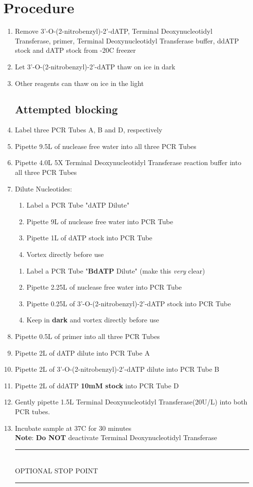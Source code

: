 \documentclass[letterpaper]{article}
\newcommand{\tdt}{Terminal Deoxynucleotidyl Transferase}
\newcommand{\C}{\degree{}C}
\newcommand{\uL}{\micro{}L}
\newcommand{\BdATP}{3'-O-(2-nitrobenzyl)-2'-dATP}
\newcommand{\stopPoint}{\begin{center}
\rule{0.5\textwidth}{.4pt}\\
\vspace{1mm} 
OPTIONAL STOP POINT\\
\rule{0.5\textwidth}{.4pt}
\end{center}}
\begin{document}
\section{Procedure}%
\begin{enumerate} 
\subsection{Sample Preparation}
\item{Remove \BdATP{}, \tdt{}, primer, \tdt{}  buffer, ddATP stock and dATP stock from -20\C{} freezer}
\item{Let \BdATP{} thaw on ice in dark}
\item{Other reagents can thaw on ice in the light}
\subsection{Attempted blocking}
\item{Label three PCR Tubes A, B and D, respectively}
\item{Pipette 9.5\uL{} of nuclease free water into all three PCR Tubes}
\item{Pipette 4.0\uL{} 5X \tdt{} reaction buffer into all three PCR Tubes}
\item{Dilute Nucleotides:
\begin{enumerate}
\item{Label a PCR Tube "dATP Dilute"}
\item{Pipette 9\uL{} of nuclease free water into PCR Tube}
\item{Pipette 1\uL{} of dATP stock into PCR Tube}
\item{Vortex directly before use}
\end{enumerate}
\begin{enumerate}
\item{Label a PCR Tube "\textbf{BdATP} Dilute" (make this \textit{very} clear)}
\item{Pipette 2.25\uL{} of nuclease free water into PCR Tube}
\item{Pipette 0.25\uL{} of \BdATP{} stock into PCR Tube}
\item{Keep in \textbf{dark} and vortex directly before use}
\end{enumerate}
}
\item{Pipette 0.5\uL{} of primer into all three PCR Tubes}
\item{Pipette 2\uL{} of dATP dilute into PCR Tube A}
\item{Pipette 2\uL{} of \BdATP{} dilute into PCR Tube B}
\item{Pipette 2\uL{} of ddATP \textbf{10mM stock} into PCR Tube D}
\item{Gently pipette 1.5\uL{} \tdt (20U/\uL{}) into both PCR tubes.}
\item{Incubate sample at 37\C{} for 30 minutes}\\
\textbf{Note}: \textbf{Do NOT} deactivate \tdt{} 
\stopPoint{} 

\end{enumerate}
\end{document}
